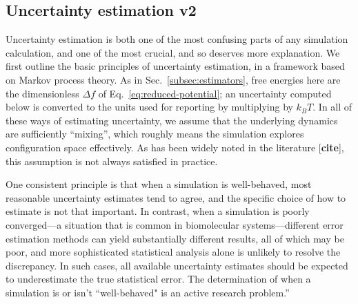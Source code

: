 
\subsection{Uncertainty estimation v2}
\label{subsec:uncertainty}

Uncertainty estimation is both one of the most confusing parts of any simulation calculation, and one of the most crucial, and so deserves more explanation. We first outline the basic principles of uncertainty estimation, in a framework based on Markov process theory. As in Sec.~\ref{subsec:estimators}, free energies here are the dimensionless $\Delta f$ of Eq.~\ref{eq:reduced-potential}; an uncertainty computed below is converted to the units used for reporting by multiplying by $k_B T$. In all of these ways of estimating uncertainty, we assume that the underlying dynamics are sufficiently ``mixing'', which roughly means the simulation explores configuration space effectively. As has been widely noted in the literature [\textbf{cite}], this assumption is not always satisfied in practice. 

One consistent principle is that when a simulation is well-behaved, most reasonable uncertainty estimates tend to agree, and the specific choice of how to estimate is not that important.  In contrast, when a simulation is poorly converged---a situation that is common in biomolecular systems---different error estimation methods can yield substantially different results, all of which may be poor, and more sophisticated statistical analysis alone is unlikely to resolve the discrepancy. In such cases, all available uncertainty estimates should be expected to underestimate the true statistical error. The determination of when a simulation is or isn't ``well-behaved" is an active research problem.'' %

